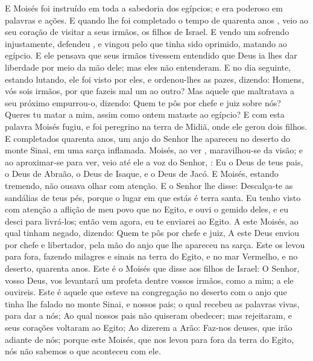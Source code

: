 {  E Moisés foi instruído em toda a sabedoria dos egípcios; e era poderoso em palavras e ações.
  E quando lhe foi completado o tempo de quarenta anos
{},  veio ao seu coração
{} de visitar a seus irmãos, os filhos de Israel.
  E vendo um
{} sofrendo injustamente, defendeu
{},  e vingou pelo que tinha sido oprimido, matando ao egípcio.
  E ele pensava que seus irmãos tivessem entendido que Deus ia lhes dar liberdade por meio da mão dele; mas eles não entenderam.
  E no dia seguinte, estando
{} lutando, ele foi visto por eles, e ordenou-lhes
{} as pazes, dizendo: Homens, vós sois irmãos, por que fazeis mal um ao outro?
  Mas aquele que maltratava a seu próximo empurrou-o, dizendo: Quem te pôs por chefe e juiz sobre nós?
  Queres tu
{} matar a mim, assim como ontem mataste ao egípcio?
  E com esta palavra Moisés fugiu, e foi peregrino na terra de Midiã, onde ele gerou dois filhos.
  E completados quarenta anos, um anjo do Senhor lhe apareceu no deserto do monte Sinai, em uma sarça inflamada.
  Moisés, ao ver
{}, maravilhou-se da visão; e ao aproximar-se para ver, veio até ele a voz do Senhor,
   : Eu
{} o Deus de teus pais, o Deus de Abraão, o Deus de Isaque, e o Deus de Jacó. E Moisés, estando tremendo, não ousava olhar com atenção.
  E o Senhor lhe disse: Descalça-te as sandálias de teus pés, porque o lugar em que estás é terra santa.
  Eu tenho visto com atenção a aflição de meu povo que
{} no Egito, e ouvi o gemido deles, e eu desci para livrá-los; então vem agora, eu te enviarei ao Egito.
  A este Moisés, ao qual tinham negado, dizendo: Quem te pôs por chefe e juiz, A este Deus enviou por chefe e libertador, pela mão do anjo que lhe apareceu na sarça.
  Este os levou para fora, fazendo milagres e sinais na terra do Egito, e no mar Vermelho, e no deserto,
{} quarenta anos.
  Este é o Moisés que disse aos filhos de Israel: O Senhor, vosso Deus, vos levantará um profeta dentre vossos irmãos, como a mim; a ele ouvireis.
  Este é aquele que esteve na congregação
{} no deserto com o anjo que tinha lhe falado no monte Sinai, e
{} nossos pais; o qual recebeu as palavras vivas, para dar a nós;
  Ao qual nossos pais não quiseram obedecer; mas
{} rejeitaram, e seus corações voltaram ao Egito;
  Ao dizerem a Arão: Faz-nos deuses, que irão adiante de nós; porque
{} este Moisés, que nos levou para fora da terra do Egito, nós não sabemos o que aconteceu com ele.
}
